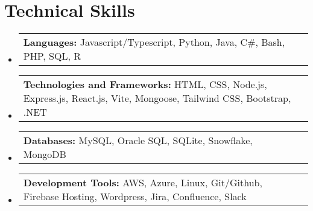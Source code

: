 \documentclass[letterpaper,11pt]{article}
\makeatletter
\newcommand{\resumeSubItem}[2]{ 
  \item
    \begin{tabular*}{\textwidth}{@{}l@{}l}
      {\small\textbf{#1}} {\small #2} \\ 
    \end{tabular*}\vspace{-6pt}
}
\newcommand{\resumeSubHeadingListStart}{\begin{itemize}[leftmargin=0.0in, label={}]}
\newcommand{\resumeSubHeadingListEnd}{\end{itemize}}
\makeatother
\begin{document}
\section{Technical Skills}
  \resumeSubHeadingListStart
    \resumeSubItem{Languages:}
      {Javascript/Typescript, Python, Java, C\#, Bash, PHP, SQL, R}
      \resumeSubItem{Technologies and Frameworks:}
      {HTML, CSS, Node.js, Express.js, React.js, Vite, Mongoose, Tailwind CSS, Bootstrap, .NET}
    \resumeSubItem{Databases:}
      {MySQL, Oracle SQL, SQLite, Snowflake, MongoDB}
    \resumeSubItem{Development Tools:}
      {AWS, Azure, Linux, Git/Github, Firebase Hosting, Wordpress, Jira, Confluence, Slack}
  \resumeSubHeadingListEnd
\end{document}
